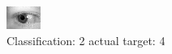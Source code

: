 \begin{figure}[h!]
\begin{center}
\includegraphics[width=0.60\columnwidth]{figures/ID775_class_2_target_4.png}
\end{center}
\caption{ Classification: 2 actual target: 4}
\label{fig:ID775_class_2_target_4}
\end{figure}
